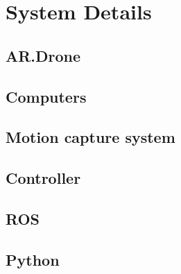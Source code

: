\appendix
\chapter{System Details}
\section{AR.Drone}
\section{Computers}  %
\section{Motion capture system}
\section{Controller}
\section{ROS}  %
\section{Python}
